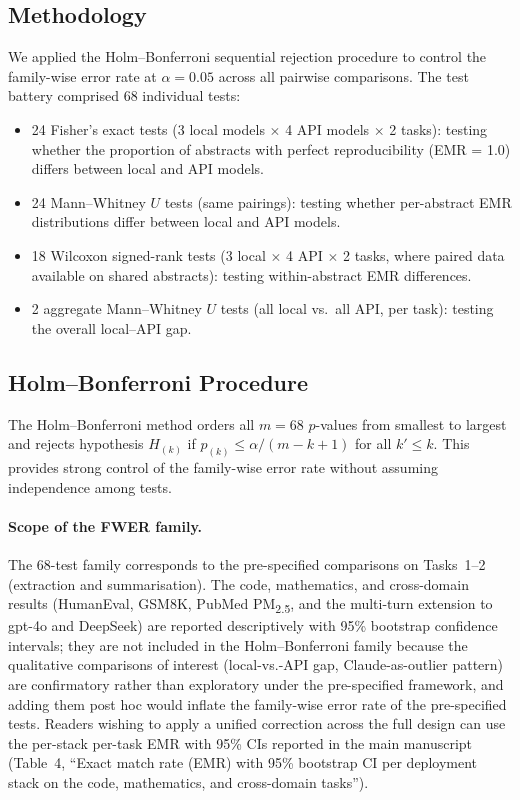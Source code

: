 \documentclass[11pt]{article}
\begin{document}
\subsection{Methodology}

We applied the Holm--Bonferroni sequential rejection procedure to control the family-wise error rate at $\alpha = 0.05$ across all pairwise comparisons. The test battery comprised 68 individual tests:

\begin{itemize}[noitemsep]
    \item 24 Fisher's exact tests (3 local models $\times$ 4 API models $\times$ 2 tasks): testing whether the proportion of abstracts with perfect reproducibility (EMR = 1.0) differs between local and API models.
    \item 24 Mann--Whitney $U$ tests (same pairings): testing whether per-abstract EMR distributions differ between local and API models.
    \item 18 Wilcoxon signed-rank tests (3 local $\times$ 4 API $\times$ 2 tasks, where paired data available on shared abstracts): testing within-abstract EMR differences.
    \item 2 aggregate Mann--Whitney $U$ tests (all local vs.\ all API, per task): testing the overall local--API gap.
\end{itemize}

\subsection{Holm--Bonferroni Procedure}

The Holm--Bonferroni method orders all $m = 68$ $p$-values from smallest to largest and rejects hypothesis $H_{(k)}$ if $p_{(k)} \leq \alpha / (m - k + 1)$ for all $k' \leq k$. This provides strong control of the family-wise error rate without assuming independence among tests.

\paragraph{Scope of the FWER family.}\label{par:fwer-scope}
The 68-test family corresponds to the pre-specified comparisons on Tasks~1--2 (extraction and summarisation). The code, mathematics, and cross-domain results (HumanEval, GSM8K, PubMed PM\textsubscript{2.5}, and the multi-turn extension to gpt-4o and DeepSeek) are reported descriptively with 95\% bootstrap confidence intervals; they are not included in the Holm--Bonferroni family because the qualitative comparisons of interest (local-vs.-API gap, Claude-as-outlier pattern) are confirmatory rather than exploratory under the pre-specified framework, and adding them post hoc would inflate the family-wise error rate of the pre-specified tests. Readers wishing to apply a unified correction across the full design can use the per-stack per-task EMR with 95\% CIs reported in the main manuscript (Table~4, ``Exact match rate (EMR) with 95\% bootstrap CI per deployment stack on the code, mathematics, and cross-domain tasks'').
\end{document}
